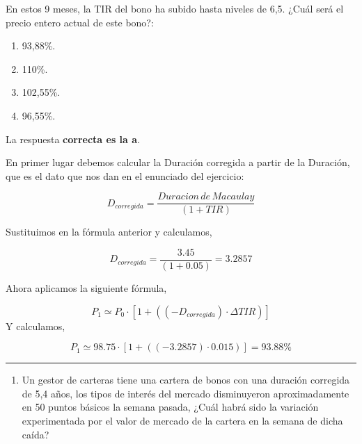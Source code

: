 \documentclass[
  letterpaper,
  DIV=11,
  numbers=noendperiod]{scrreprt}
\providecommand{\tightlist}{%
  \setlength{\itemsep}{0pt}\setlength{\parskip}{0pt}}\usepackage{longtable,booktabs,array}
\begin{document}
En estos 9 meses, la TIR del bono ha subido hasta niveles de 6,5. ¿Cuál
será el precio entero actual de este bono?:

\begin{enumerate}
\def\labelenumi{\alph{enumi})}
\item
  93,88\%.
\item
  110\%.
\item
  102,55\%.
\item
  96,55\%.
\end{enumerate}

\begin{tcolorbox}[enhanced jigsaw, left=2mm, opacityback=0, colback=white, breakable, arc=.35mm, bottomrule=.15mm, rightrule=.15mm, toprule=.15mm, leftrule=.75mm, colframe=quarto-callout-tip-color-frame]
\begin{minipage}[t]{5.5mm}
\textcolor{quarto-callout-tip-color}{\faLightbulb}
\end{minipage}%
\begin{minipage}[t]{\textwidth - 5.5mm}

La respuesta \textbf{correcta es la a}.

En primer lugar debemos calcular la Duración corregida a partir de la
Duración, que es el dato que nos dan en el enunciado del ejercicio:

\[D_{corregida}=\frac{Duracion\,de\, Macaulay}{\left(1+TIR\right)}\]

Sustituimos en la fórmula anterior y calculamos,

\[D_{corregida}=\frac{3.45}{(1+0.05)}=3.2857\]

Ahora aplicamos la siguiente fórmula,

\[P_1\simeq P_0\cdot\left[1+(\left(-D_{corregida}\right)\cdot\Delta TIR)\right]\]
Y calculamos,

\[P_1\simeq 98.75\cdot\left[1+(\left(-3.2857\right)\cdot0.015)\right]=93.88\%\]

\end{minipage}%
\end{tcolorbox}

\begin{center}\rule{0.5\linewidth}{0.5pt}\end{center}

\begin{enumerate}
\def\labelenumi{\arabic{enumi}.}
\setcounter{enumi}{106}
\tightlist
\item
  Un gestor de carteras tiene una cartera de bonos con una duración
  corregida de 5,4 años, los tipos de interés del mercado disminuyeron
  aproximadamente en 50 puntos básicos la semana pasada, ¿Cuál habrá
  sido la variación experimentada por el valor de mercado de la cartera
  en la semana de dicha caída?
\end{enumerate}
\end{document}
